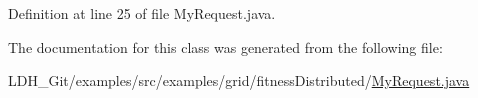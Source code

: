 Definition at line 25 of file My\-Request.\-java.



The documentation for this class was generated from the following file\-:\begin{DoxyCompactItemize}
\item 
L\-D\-H\-\_\-\-Git/examples/src/examples/grid/fitness\-Distributed/\hyperlink{_my_request_8java}{My\-Request.\-java}\end{DoxyCompactItemize}
